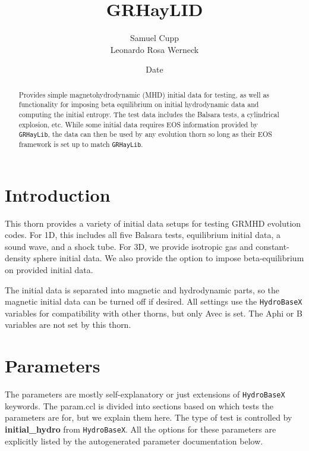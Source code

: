 \documentclass{article}
\newcommand{\glib}{\texttt{GRHayLib}\xspace}
\newcommand{\hbase}{\texttt{HydroBaseX}\xspace}
\begin{document}
\title{GRHayLID}
\author{Samuel Cupp \\ Leonardo Rosa Werneck}
\date{$ $Date$ $}

\maketitle


\begin{abstract}
Provides simple magnetohydrodynamic (MHD) initial data for testing,
as well as functionality for imposing beta equilibrium on initial
hydrodynamic data and computing the initial entropy. The test data
includes the Balsara tests, a cylindrical explosion, etc. While
some initial data requires EOS information provided by \glib,
the data can then be used by any evolution thorn so long as their EOS
framework is set up to match \glib.
\end{abstract}

\section{Introduction}

This thorn provides a variety of initial data setups for
testing GRMHD evolution codes. For 1D, this includes all five
Balsara tests, equilibrium initial data, a sound wave, and
a shock tube. For 3D, we provide isotropic gas and
constant-density sphere initial data. We also provide the option
to impose beta-equilibrium on provided initial data.

The initial data is separated into magnetic and hydrodynamic
parts, so the magnetic initial data can be turned off if desired.
All settings use the \hbase variables for compatibility with
other thorns, but only Avec is set. The Aphi or B variables are
not set by this thorn.

\section{Parameters}

The parameters are mostly self-explanatory or just extensions of
\hbase keywords. The param.ccl is divided into sections based
on which tests the parameters are for, but we explain them here.
The type of test is controlled by \textbf{initial\_hydro} from
\hbase. All the options for these parameters are explicitly
listed by the autogenerated parameter documentation below.
\end{document}

